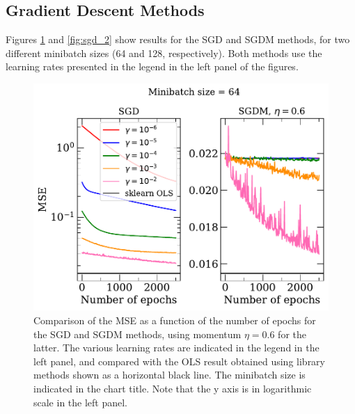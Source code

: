 \documentclass[a4paper, 
amsfonts, 
amssymb, 
amsmath, 
reprint, 
showkeys, 
nofootinbib, 
twoside]{revtex4-2}
\begin{document}
 

\subsection{Gradient Descent Methods}
Figures \ref{fig:sgd_1} and \ref{fig:sgd_2} show results for the SGD and SGDM methods, for two different minibatch sizes (64 and 128, respectively). Both methods use the learning rates presented in the legend in the left panel of the figures. 

\begin{figure} [h]
    \centering
    \includegraphics[width = \columnwidth]{Figures/sgd_1.pdf}
    \caption{Comparison of the MSE as a function of the number of epochs for the SGD and SGDM methods, using momentum $\eta = 0.6$ for the latter. The various learning rates are indicated in the legend in the left panel, and compared with the OLS result obtained using library methods shown as a horizontal black line. The minibatch size is indicated in the chart title. Note that the y axis is in logarithmic scale in the left panel. }
    \label{fig:sgd_1}
\end{figure}
\end{document}

